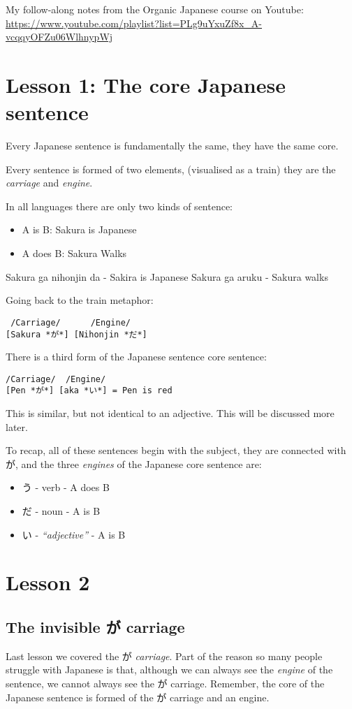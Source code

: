 \documentclass[11pt]{article}
\author{Jordan Cross}
\date{\today}
\title{}
\begin{document}
\tableofcontents

My follow-along notes from the Organic Japanese course on Youtube: \url{https://www.youtube.com/playlist?list=PLg9uYxuZf8x\_A-vcqqyOFZu06WlhnypWj}
\section{Lesson 1: The core Japanese sentence}
\label{sec:org95b8610}
Every Japanese sentence is fundamentally the same, they have the same core.

Every sentence is formed of two elements, (visualised as a train) they are the \emph{carriage} and \emph{engine}.

In all languages there are only two kinds of sentence:
\begin{itemize}
\item A is B: Sakura is Japanese
\item A does B: Sakura Walks
\end{itemize}

Sakura ga nihonjin da - Sakira is Japanese
Sakura ga aruku - Sakura walks

Going back to the train metaphor:
\begin{verbatim}
 /Carriage/      /Engine/
[Sakura *が*] [Nihonjin *だ*]
\end{verbatim}

There is a third form of the Japanese sentence core sentence:
\begin{verbatim}
/Carriage/  /Engine/
[Pen *が*] [aka *い*] = Pen is red
\end{verbatim}

This is similar, but not identical to an adjective. This will be discussed more later.

To recap, all of these sentences begin with the subject, they are connected with が, and the three \emph{engines} of the Japanese core sentence are:
\begin{itemize}
\item う - verb          - A does B
\item だ - noun          - A is B
\item い - \emph{``adjective''} - A is B
\end{itemize}

\section{Lesson 2}
\label{sec:orgdf84931}
\subsection{The invisible が carriage}
\label{sec:org2d81dcb}
Last lesson we covered the が \emph{carriage}. Part of the reason so many people struggle with Japanese is that, although we can always see the \emph{engine} of the sentence, we cannot always see the が carriage. Remember, the core of the Japanese sentence is formed of the が carriage and an engine.
\end{document}
